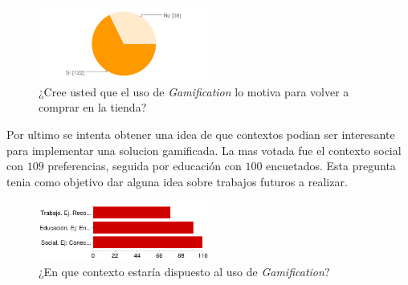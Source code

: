 \begin{figure}[!htb]
  \centering
  \includegraphics[width=0.5\textwidth]{images/chartPreg10.png}
  \caption[chart10]{¿Cree usted que el uso de \emph{Gamification} lo motiva para volver a comprar en la tienda?}
  \label{fig:chart2}
\end{figure}

Por ultimo se intenta obtener una idea de que contextos podian ser interesante para implementar una
solucion gamificada. La mas votada fue el contexto social con $109$ preferencias, seguida por educación con
$100$ encuetados. Esta pregunta tenia como objetivo dar alguna idea sobre trabajos futuros a realizar.

\begin{figure}[!htb]
  \centering
  \includegraphics[width=0.5\textwidth]{images/chartPreg11.png}
  \caption[chart11]{¿En que contexto estaría dispuesto al uso de \emph{Gamification}?}
  \label{fig:chart2}
\end{figure}
